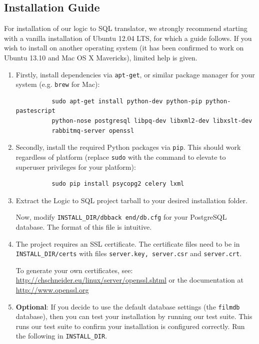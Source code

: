 \documentclass[a4paper, 11pt]{article}
\begin{document}
  \subsection{Installation Guide}
    For installation of our logic to SQL translator, we strongly recommend
    starting with a vanilla installation of Ubuntu 12.04 LTS, for which a guide
    follows. If you wish to install on another operating system (it has been 
    confirmed to work on Ubuntu 13.10 and Mac OS X Mavericks),
    limited help is given.

    \begin{enumerate}
      \item Firstly, install dependencies via \texttt{apt-get}, or similar
        package manager for your system (e.g. \texttt{brew} for Mac):
        \begin{verbatim}
          sudo apt-get install python-dev python-pip python-pastescript
          python-nose postgresql libpq-dev libxml2-dev libxslt-dev
          rabbitmq-server openssl
        \end{verbatim}

      \item Secondly, install the required Python packages via \texttt{pip}.
        This should work regardless of platform (replace \texttt{sudo} with the
        command to elevate to superuser privileges for your platform):
        \begin{verbatim}
          sudo pip install psycopg2 celery lxml
        \end{verbatim}

      \item Extract the Logic to SQL project tarball to your desired
        installation folder.

        Now, modify \texttt{INSTALL\_DIR/dbback end/db.cfg} for your PostgreSQL
        database. The format of this file is intuitive.

      \item The project requires an SSL certificate. The certificate
        files need to be in \texttt{INSTALL\_DIR/certs} with files
        \texttt{server.key, server.csr} and \texttt{server.crt}.

        To generate your own certificates, see:\\
        \url{http://chschneider.eu/linux/server/openssl.shtml} or the
        documentation at \url{http://www.openssl.org}

      \item \textbf{Optional}: If you decide to use
        the default database settings (the \texttt{filmdb} database), then you
        can test your installation by running our test suite. This runs
        our test suite to confirm your installation is configured correctly.
        Run the following in \texttt{INSTALL\_DIR}.


\end{enumerate}
\end{document}
